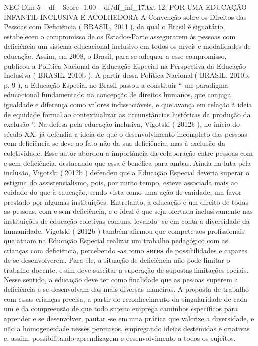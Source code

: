 \begin{textsample}{NEG Dim 5 – df – Score -1.00 – df/df\_inf\_17.txt}  \label{ex:f5_neg_139}
12.
POR UMA EDUCAÇÃO INFANTIL INCLUSIVA E ACOLHEDORA A Convenção sobre os Direitos das Pessoas com Deficiência ( BRASIL, 2011 ), da qual o Brasil é signatário, estabeleceu o compromisso de os Estados-Parte assegurarem às pessoas com deficiência um sistema educacional inclusivo em todos os níveis e modalidades de educação.
Assim, em 2008, o Brasil, para se adequar a esse compromisso, publicou a Política Nacional da Educação Especial na Perspectiva da Educação Inclusiva ( BRASIL, 2010b ).
A partir dessa Política Nacional ( BRASIL, 2010b, p. 9 ), a Educação Especial no Brasil passou a constituir “ um paradigma educacional fundamentado na concepção de direitos humanos, que conjuga igualdade e diferença como valores indissociáveis, e que avança em relação à ideia de equidade formal ao contextualizar as circunstâncias históricas da produção da exclusão ”.
Na defesa pela educação inclusiva, Vigotski ( 2012b ), no início do século XX, já defendia a ideia de que o desenvolvimento incompleto das pessoas com deficiência se deve ao fato não da sua deficiência, mas à exclusão da coletividade.
Esse autor abordou a importância da colaboração entre pessoas com e sem deficiência, destacando que essa é benéfica para ambas.
Ainda na luta pela inclusão, Vigotski ( 2012b ) defendeu que a Educação Especial deveria superar o estigma do assistencialismo, pois, por muito tempo, esteve associada mais ao cuidado do que à educação, sendo vista como uma ação de caridade, um favor prestado por algumas instituições.
Entretanto, a educação é um direito de todas as pessoas, com e sem deficiência, e o ideal é que seja ofertada inclusivamente nas instituições de educação coletivas comuns, levando -se em conta a diversidade da humanidade.
Vigotski ( 2012b ) também afirmou que compete aos profissionais que atuam na Educação Especial realizar um trabalho pedagógico com as crianças com deficiência, percebendo -as como \textbf{seres} de possibilidades e capazes de se desenvolverem.
Para ele, a situação de deficiência não pode limitar o trabalho docente, e sim deve suscitar a superação de supostas limitações sociais.
Nesse sentido, a educação deve ter como finalidade que as pessoas superem a deficiência e se desenvolvam das mais diversas maneiras.
A proposta de trabalho com essas crianças precisa, a partir do reconhecimento da singularidade de cada um e da compreensão de que todo sujeito emprega caminhos específicos para aprender e se desenvolver, pautar -se em uma prática que valorize a diversidade, e não a homogeneidade nesses percursos, empregando ideias destemidas e criativas e, assim, possibilitando aprendizagem e desenvolvimento a todos os sujeitos.

\end{textsample}
